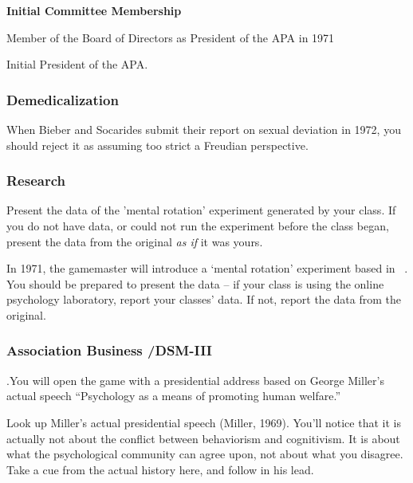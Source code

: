 \begin{refsection}
\textbf{Initial Committee Membership}
\begin{service}[Miller]\label{service:miller}
Member of the Board of Directors as President of the APA in 1971
\end{service}

Initial President of the APA.

\subsubsection{Demedicalization}
\label{demedicalization}

When Bieber and Socarides submit their report on sexual deviation in 1972, you should reject it as assuming too strict a Freudian perspective.

\subsubsection{Research}
\label{research}

\begin{researchtask}[Miller]\label{researchtask:miller}
Present the data of the 'mental rotation' experiment generated by your class. If you do not have data, or could not run the experiment before the class began, present the data from the original \emph{as if} it was yours.
\end{researchtask}

In 1971, the gamemaster will introduce a `mental rotation' experiment based in ~\citep{Shepard:1971uf}. You should be prepared to present the data – if your class is using the online psychology laboratory, report your classes' data. If not, report the data from the original.

\subsubsection{Association Business \slash  DSM-III}
\label{associationbusinessdsm-iii}

\begin{writingtask}[Miller]\label{writingtask:miller}
.You will open the game with a presidential address based on George Miller's actual speech “Psychology as a means of promoting human welfare.”
\end{writingtask}Look up Miller’s actual presidential speech (Miller, 1969). You’ll notice that it is actually not about the conflict between behaviorism and cognitivism. It is about what the psychological community can agree upon, not about what you disagree. Take a cue from the actual history here, and follow in his lead.


\end{refsection}
